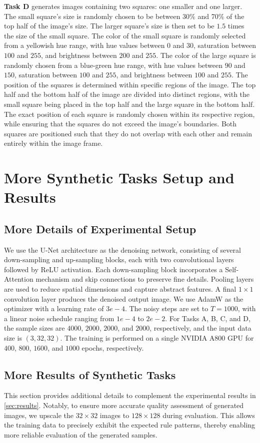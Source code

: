 \textbf{Task D} generates images containing two squares: one smaller and one larger. The small square's size is randomly chosen to be between 30\% and 70\% of the top half of the image's size. The larger square's size is then set to be $1.5$ times the size of the small square. The color of the small square is randomly selected from a yellowish hue range, with hue values between $0$ and $30$, saturation between $100$ and $255$, and brightness between $200$ and $255$. The color of the large square is randomly chosen from a blue-green hue range, with hue values between $90$ and $150$, saturation between $100$ and $255$, and brightness between $100$ and $255$. The position of the squares is determined within specific regions of the image. The top half and the bottom half of the image are divided into distinct regions, with the small square being placed in the top half and the large square in the bottom half. The exact position of each square is randomly chosen within its respective region, while ensuring that the squares do not exceed the image's boundaries. Both squares are positioned such that they do not overlap with each other and remain entirely within the image frame.


\section{More Synthetic Tasks Setup and Results}
\subsection{More Details of Experimental Setup}
\label{app:Details of DMs' Training}
We use the U-Net architecture as the denoising network, consisting of several down-sampling and up-sampling blocks, each with two convolutional layers followed by ReLU activation. Each down-sampling block incorporates a Self-Attention mechanism and skip connections to preserve fine details. Pooling layers are used to reduce spatial dimensions and capture abstract features. A final $1 \times 1$ convolution layer produces the denoised output image. We use AdamW \cite{loshchilov2017decoupled} as the optimizer with a learning rate of $3e-4$. The noisy steps are set to $T = 1000$, with a linear noise schedule ranging from $1e-4$ to $2e-2$. For Tasks A, B, C, and D, the sample sizes are $4000$, $2000$, $2000$, and $2000$, respectively, and the input data size is $(3, 32, 32)$. The training is performed on a single NVIDIA A800 GPU for $400$, $800$, $1600$, and $1000$ epochs, respectively.
\subsection{More Results of Synthetic Tasks}
\label{app:More Results of Synthetic Tasks}
This section provides additional details to complement the experimental results in \cref{sec:results}. Notably, to ensure more accurate quality assessment of generated images, we upscale the $32 \times 32$ images to $128 \times 128$ during evaluation. This allows the training data to precisely exhibit the expected rule patterns, thereby enabling more reliable evaluation of the generated samples.
